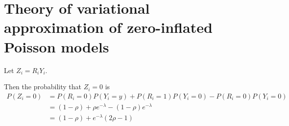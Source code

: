 \documentclass{amsart}
\begin{document}


\section{Theory of variational approximation of zero-inflated Poisson models}
Let $Z_i = R_i Y_i$.

Then the probability that $Z_i = 0$ is
\begin{align*}
P(Z_i = 0) &= P(R_i = 0)P(Y_i = y) + P(R_i = 1) P(Y_i = 0) - P(R_i = 0) P(Y_i = 0) \\
&= (1 - \rho) + \rho e^{-\lambda} - (1 - \rho) e^{-\lambda} \\
&= (1 - \rho) + e^{-\lambda}(2 \rho - 1)
\end{align*}





\end{document}
